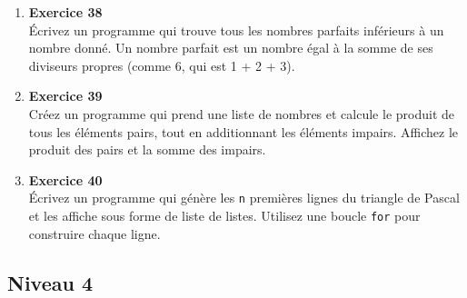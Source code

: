 \documentclass{article}
\begin{document}
\begin{enumerate}
    \item \textbf{Exercice 38} \\
    Écrivez un programme qui trouve tous les nombres parfaits inférieurs à un nombre donné. Un nombre parfait est un nombre égal à la somme de ses diviseurs propres (comme 6, qui est 1 + 2 + 3).

    \item \textbf{Exercice 39} \\
    Créez un programme qui prend une liste de nombres et calcule le produit de tous les éléments pairs, tout en additionnant les éléments impairs. Affichez le produit des pairs et la somme des impairs.

    \item \textbf{Exercice 40} \\
    Écrivez un programme qui génère les \texttt{n} premières lignes du triangle de Pascal et les affiche sous forme de liste de listes. Utilisez une boucle \texttt{for} pour construire chaque ligne.

\end{enumerate}



\subsection{Niveau 4}
\end{document}

